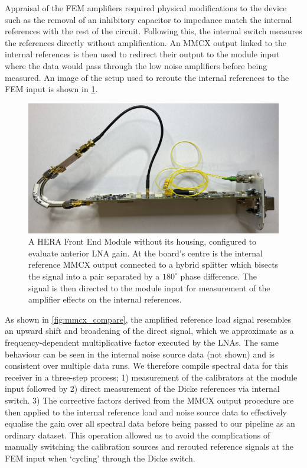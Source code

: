 Appraisal of the FEM amplifiers required physical modifications to the device such as the removal of an inhibitory capacitor to impedance match the internal references with the rest of the circuit. Following this, the internal switch measures the references directly without amplification. An MMCX output linked to the internal references is then used to redirect their output to the module input where the data would pass through the low noise amplifiers before being measured. An image of the setup used to reroute the internal references to the FEM input is shown in \cref{fig:hera_reroute}.
\begin{figure}
    \centering
    \includegraphics[width=.8\textwidth]{hera_reroute}
    \caption{A HERA Front End Module without its housing, configured to evaluate anterior LNA gain. At the board's centre is the internal reference MMCX output connected to a hybrid splitter which bisects the signal into a pair separated by a $180^{\circ}$ phase difference. The signal is then directed to the module input for measurement of the amplifier effects on the internal references.}
    \label{fig:hera_reroute}
\end{figure}
As shown in \cref{fig:mmcx_compare}, the amplified reference load signal resembles an upward shift and broadening of the direct signal, which we approximate as a frequency-dependent multiplicative factor executed by the LNAs. The same behaviour can be seen in the internal noise source data (not shown) and is consistent over multiple data runs. We therefore compile spectral data for this receiver in a three-step process; 1) measurement of the calibrators at the module input followed by 2) direct measurement of the Dicke references via internal switch. 3) The corrective factors derived from the MMCX output procedure are then applied to the internal reference load and noise source data to effectively equalise the gain over all spectral data before being passed to our pipeline as an ordinary dataset. This operation allowed us to avoid the complications of manually switching the calibration sources and rerouted reference signals at the FEM input when ‘cycling’ through the Dicke switch.
